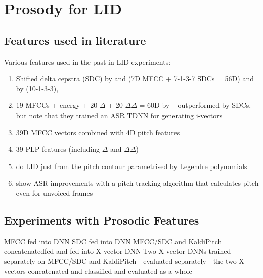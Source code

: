\documentclass[bsc,frontabs,twoside,singlespacing,parskip,deptreport]{infthesis}
\begin{document}
\chapter{Prosody for LID}{
  \section{Features used in literature}{
    Various features used in the past in LID experiments:
    \begin{enumerate}
    \item{Shifted delta cepstra (SDC) by \cite{Ferrer_et_al_2016} and \cite{Sarma_et_al_2018} (7D MFCC + 7-1-3-7 SDCs = 56D) and by \cite{Torres-Carrasquillo_et_al_2002} (10-1-3-3), }
    \item{19 MFCCs + energy + 20 $\Delta$ + 20 $\Delta\Delta$ = 60D by \cite{Sarma_et_al_2018} -- outperformed by SDCs, but note that they trained an ASR TDNN for generating i-vectors}
    \item{39D MFCC vectors combined with 4D pitch features \citep{Song_et_al_2013}}
    \item{39 PLP features (including $\Delta$ and $\Delta\Delta$) \citep{Lopez-Moreno_et_al_2014}}
    \item{\cite{Lin_et_al_2005} do LID just from the pitch contour parametrised by Legendre polynomials}
    \item{\cite{Ghahremani_et_al_2014} show ASR improvements with a pitch-tracking algorithm that calculates pitch even for unvoiced frames}
    \end{enumerate}
  }
  \section{Experiments with Prosodic Features}{
    MFCC fed into DNN
    SDC fed into DNN
    MFCC/SDC and KaldiPitch concatenatedfed and fed into X-vector DNN
    Two X-vector DNNs trained separately on MFCC/SDC and KaldiPitch
    - evaluated separately
    - the two X-vectors concatenated and classified and evaluated as a whole
  }
}



\end{document}
